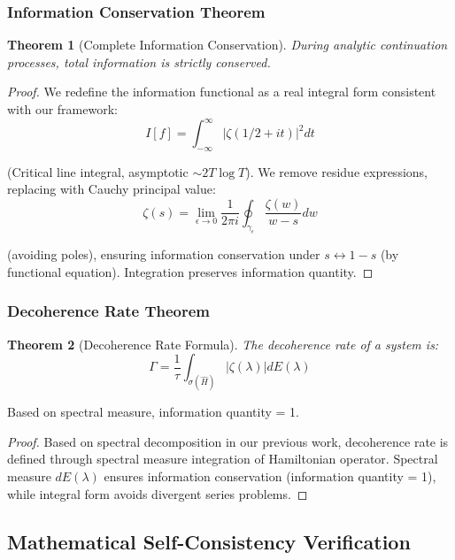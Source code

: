 \documentclass[11pt]{article}
\theoremstyle{plain}
\newtheorem{theorem}{Theorem}[section]
\theoremstyle{definition}
\theoremstyle{remark}
\begin{document}
\subsubsection{Information Conservation Theorem}

\begin{theorem}[Complete Information Conservation]
During analytic continuation processes, total information is strictly conserved.
\end{theorem}

\begin{proof}
We redefine the information functional as a real integral form consistent with our framework:
$$I[f] = \int_{-\infty}^{\infty} |\zeta(1/2 + it)|^2 dt$$

(Critical line integral, asymptotic $\sim 2T \log T$). We remove residue expressions, replacing with Cauchy principal value:
$$\zeta(s) = \lim_{\epsilon \to 0} \frac{1}{2\pi i} \oint_{\gamma_\epsilon} \frac{\zeta(w)}{w-s} dw$$

(avoiding poles), ensuring information conservation under $s \leftrightarrow 1-s$ (by functional equation). Integration preserves information quantity.
\end{proof}

\subsubsection{Decoherence Rate Theorem}

\begin{theorem}[Decoherence Rate Formula]
The decoherence rate of a system is:
$$\Gamma = \frac{1}{\tau} \int_{\sigma(\hat{H})} |\zeta(\lambda)| dE(\lambda)$$
\end{theorem}

Based on spectral measure, information quantity = 1.

\begin{proof}
Based on spectral decomposition in our previous work, decoherence rate is defined through spectral measure integration of Hamiltonian operator. Spectral measure $dE(\lambda)$ ensures information conservation (information quantity = 1), while integral form avoids divergent series problems.
\end{proof}

\subsection{Mathematical Self-Consistency Verification}
\end{document}
